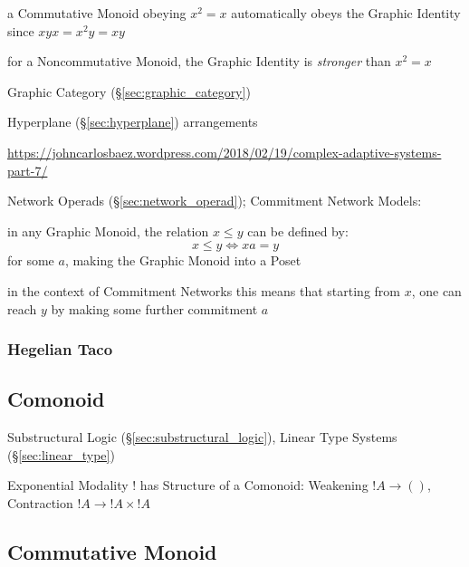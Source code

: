a Commutative Monoid obeying $x^2 = x$ automatically obeys the Graphic Identity
since $xyx = x^2y = xy$

for a Noncommutative Monoid, the Graphic Identity is \emph{stronger} than $x^2
= x$


Graphic Category (\S\ref{sec:graphic_category})

Hyperplane (\S\ref{sec:hyperplane}) arrangements

\url{https://johncarlosbaez.wordpress.com/2018/02/19/complex-adaptive-systems-part-7/}

Network Operads (\S\ref{sec:network_operad}); Commitment Network Models:

in any Graphic Monoid, the relation $x \leq y$ can be defined by:
\[
  x \leq y \Leftrightarrow x a = y
\]
for some $a$, making the Graphic Monoid into a Poset

in the context of Commitment Networks this means that starting from $x$, one
can reach $y$ by making some further commitment $a$



\subsubsection{Hegelian Taco}\label{sec:hegelian_taco}



\subsection{Comonoid}\label{sec:comonoid}

Substructural Logic (\S\ref{sec:substructural_logic}), Linear Type
Systems (\S\ref{sec:linear_type})

Exponential Modality $!$ has Structure of a Comonoid: Weakening $!A
\rightarrow ()$, Contraction $!A \rightarrow !A \times !A$



\subsection{Commutative Monoid}\label{sec:commutative_monoid}

